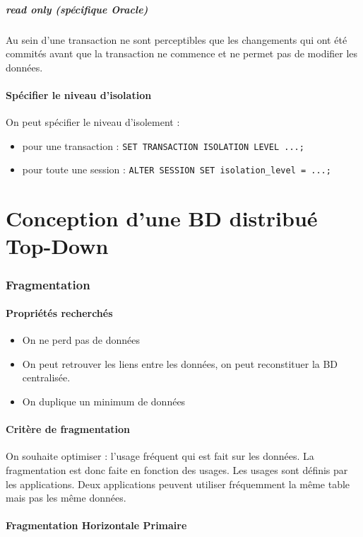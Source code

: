 \documentclass[10pt,a4paper,twoside]{article}
\begin{document}
\subsubsection{read only (spécifique Oracle)}
Au sein d'une transaction ne sont perceptibles que les changements qui ont été commités avant que la transaction ne commence et ne permet pas de modifier les données.

\subsection{Spécifier le niveau d'isolation}
On peut spécifier le niveau d'isolement :
\begin{itemize}
\item pour une transaction : \verb=SET TRANSACTION ISOLATION LEVEL ...;=
\item pour toute une session : \verb$ALTER SESSION SET isolation_level = ...;$
\end{itemize}


\newpage
\part{Conception d'une BD distribué Top-Down}
\section{Fragmentation}
\subsection{Propriétés recherchés}
\begin{itemize}
\item On ne perd pas de données 
\item On peut retrouver les liens entre les données, on peut reconstituer la BD centralisée.
\item On duplique un minimum de données
\end{itemize}

\subsection{Critère de fragmentation}
On souhaite optimiser : l'usage fréquent qui est fait sur les données. La fragmentation est donc faite en fonction des usages. Les usages sont définis par les applications. Deux applications peuvent utiliser fréquemment la même table mais pas les même données.

\subsection{Fragmentation Horizontale Primaire}
\end{document}
